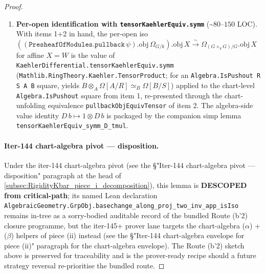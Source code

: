 \begin{proof}
\begin{enumerate}
    \item \textbf{Per-open identification with \texttt{tensorKaehlerEquiv.symm}} (\textasciitilde\(80\)--\(150\) LOC). With items 1+2 in hand, the per-open iso \(((\texttt{PresheafOfModules.pullback}\,\psi).\mathrm{obj}\,\Omega_{G/k}).\mathrm{obj}\,X \xrightarrow{\sim} \Omega_{(G \times_{k} G)/G}.\mathrm{obj}\,X\) for affine \(X = W\) is the value of \texttt{KaehlerDifferential.tensorKaehlerEquiv.symm} (\texttt{Mathlib.RingTheory.Kaehler.TensorProduct}; for an \texttt{Algebra.IsPushout R S A B} square, yields \(B \otimes_{A} \Omega[A/R] \simeq_{B} \Omega[B/S]\)) applied to the chart-level \texttt{Algebra.IsPushout} square from item 1, re-presented through the chart-unfolding equivalence \texttt{pullbackObjEquivTensor} of item 2. The algebra-side value identity \(D\,b \mapsto 1 \otimes D\,b\) is packaged by the companion simp lemma \texttt{tensorKaehlerEquiv\_symm\_D\_tmul}.
  \end{enumerate}

  \paragraph{Iter-144 chart-algebra pivot --- disposition.} Under the iter-144 chart-algebra pivot (see the \S "Iter-144 chart-algebra pivot --- disposition" paragraph at the head of \cref{subsec:RigidityKbar_piece_i_decomposition}), this lemma is \textbf{DESCOPED from critical-path}; its named Lean declaration \texttt{AlgebraicGeometry.GrpObj.basechange\_along\_proj\_two\_inv\_app\_isIso} remains in-tree as a sorry-bodied auditable record of the bundled Route (b'2) closure programme, but the iter-145+ prover lane targets the chart-algebra (\(\alpha\)) + (\(\beta\)) helpers of piece (ii) instead (see the \S "Iter-144 chart-algebra envelope for piece (ii)" paragraph for the chart-algebra envelope). The Route (b'2) sketch above is preserved for traceability and is the prover-ready recipe should a future strategy reversal re-prioritise the bundled route.
\end{proof}


